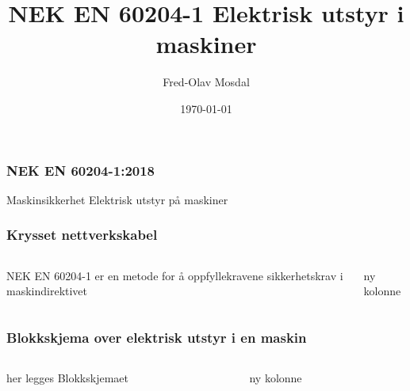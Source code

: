\documentclass[aspectratio=169,xcolor=dvipsnames]{beamer}
\title[COM]{NEK EN 60204-1 Elektrisk utstyr i maskiner} %
\author[Fred-Olav] {Fred-Olav Mosdal}
\institute[Gand VGS] %
{
    Gand VGS \\
    VG3 Automasjon }
\date{\today} %
\begin{document}
\begin{frame}
\titlepage
\end{frame}

\begin{frame}
	\frametitle{NEK EN 60204-1:2018}
	\Huge
	Maskinsikkerhet
	\vskip 1cm
	Elektrisk utstyr på maskiner
	\normalsize

\end{frame}
\begin{frame}
	\frametitle{Krysset nettverkskabel}
	\begin{columns}
		\begin{column}{0.5\textwidth}

			NEK EN 60204-1 er en metode for å oppfyllekravene sikkerhetskrav i maskindirektivet
			
		\end{column}

		\begin{column}{0.5\textwidth}
			ny kolonne
		\end{column}
	\end{columns}
\end{frame}
\begin{frame}
	\frametitle{Blokkskjema over elektrisk utstyr i en maskin}
	\begin{columns}
		\begin{column}{0.5\textwidth}

		her legges Blokkskjemaet	
	\end{column}

		\begin{column}{0.5\textwidth}
			ny kolonne
		\end{column}
	\end{columns}
\end{frame}
\end{document}
